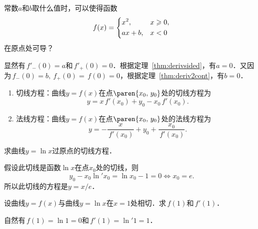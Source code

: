 \begin{example*}
  常数\(a\)和\(b\)取什么值时，可以使得函数
  \begin{equation*}
    f(x) =
    \begin{dcases}
      x^2, & x \ge 0, \\
      ax+b, & x < 0
    \end{dcases}
  \end{equation*}
  在原点处可导？

  \begin{remark}
    显然有\(\,f'_-(0) = a\)和\(\,f'_+(0) = 0\)．根据定理~\ref{thm:derivsided}，有\(a = 0\)．又因为\(\,f_-(0) = b,\ f_+(0) = \,f(0) = 0\)，根据定理~\ref{thm:deriv2cont}，有\(b = 0\)．
  \end{remark}
\end{example*}

\begin{remark}[导数的几何意义]
  \label{rem:derivgeom}
  \leavevmode
  \begin{enumerate}
  \item 切线方程：曲线\(y = f(x)\)在点\(\paren{x_0, \,y_0}\)处的切线方程为
    \begin{equation*}
      y = x\,f'(x_0) + y_0 - x_0\,f'(x_0).
    \end{equation*}
  \item 法线方程：曲线\(y = f(x)\)在点\(\paren{x_0, \,y_0}\)处的法线方程为
    \begin{equation*}
      y = - \frac{x}{\,f'(x_0)} + y_0 + \frac{x_0}{\,f'(x_0)}.
    \end{equation*}
  \end{enumerate}
\end{remark}

\begin{example*}
  求曲线\(y = \ln x\)过原点的切线方程．

  \begin{remark}
    假设此切线是函数\(\ln x\)在点\(x_0\)处的切线，则
    \begin{equation*}
      y_0 - x_0 \ln'x_0 = \ln x_0 - 1 = 0
      \iff
      x_0 = e.
    \end{equation*}
    所以此切线的方程是\(y = x/e\)．
  \end{remark}
\end{example*}

\begin{example*}
  设曲线\(y = f(x)\)与曲线\(y = \ln x\)在\(x = 1\)处相切．求\(\,f(1)\)和\(\,f'(1)\)．

  \begin{remark}
    自然有\(\,f(1) = \ln 1 = 0\)和\(\,f'(1) = \ln' 1 = 1\)．
  \end{remark}
\end{example*}

